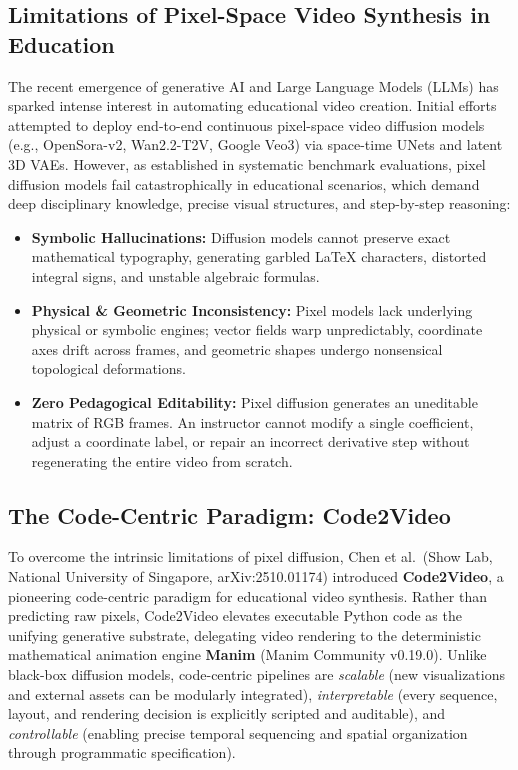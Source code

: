 \documentclass[11pt, a4paper]{article}
\begin{document}
\subsection{Limitations of Pixel-Space Video Synthesis in Education}
The recent emergence of generative AI and Large Language Models (LLMs) has sparked intense interest in automating educational video creation. Initial efforts attempted to deploy end-to-end continuous pixel-space video diffusion models (e.g., OpenSora-v2, Wan2.2-T2V, Google Veo3) via space-time UNets and latent 3D VAEs. However, as established in systematic benchmark evaluations, pixel diffusion models fail catastrophically in educational scenarios, which demand deep disciplinary knowledge, precise visual structures, and step-by-step reasoning:
\begin{itemize}[leftmargin=*]
    \item \textbf{Symbolic Hallucinations:} Diffusion models cannot preserve exact mathematical typography, generating garbled \LaTeX{} characters, distorted integral signs, and unstable algebraic formulas.
    \item \textbf{Physical \& Geometric Inconsistency:} Pixel models lack underlying physical or symbolic engines; vector fields warp unpredictably, coordinate axes drift across frames, and geometric shapes undergo nonsensical topological deformations.
    \item \textbf{Zero Pedagogical Editability:} Pixel diffusion generates an uneditable matrix of RGB frames. An instructor cannot modify a single coefficient, adjust a coordinate label, or repair an incorrect derivative step without regenerating the entire video from scratch.
\end{itemize}

\subsection{The Code-Centric Paradigm: Code2Video}
To overcome the intrinsic limitations of pixel diffusion, Chen et al.\ (Show Lab, National University of Singapore, arXiv:2510.01174) introduced \textbf{Code2Video}, a pioneering code-centric paradigm for educational video synthesis. Rather than predicting raw pixels, Code2Video elevates executable Python code as the unifying generative substrate, delegating video rendering to the deterministic mathematical animation engine \textbf{Manim} (Manim Community v0.19.0). Unlike black-box diffusion models, code-centric pipelines are \textit{scalable} (new visualizations and external assets can be modularly integrated), \textit{interpretable} (every sequence, layout, and rendering decision is explicitly scripted and auditable), and \textit{controllable} (enabling precise temporal sequencing and spatial organization through programmatic specification).
\end{document}
